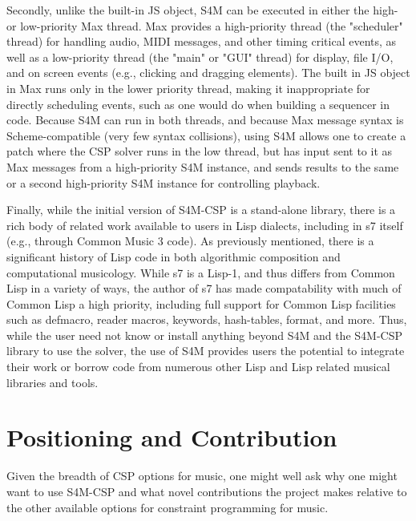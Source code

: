 \documentclass[pmlr]{jmlr}%
\begin{document}
Secondly, unlike the built-in JS object, S4M can be executed in either the high- or low-priority Max thread.
Max provides a high-priority thread (the "scheduler" thread) for handling audio, MIDI messages, and other
timing critical events, as well as a low-priority thread (the "main" or "GUI" thread) for display, file I/O,
and on screen events (e.g., clicking and dragging elements). The built in JS object in Max runs only in the
lower priority thread, making it inappropriate for directly scheduling events, such as one would do 
when building a sequencer in code. Because S4M can run in both threads, and because Max message syntax
is Scheme-compatible (very few syntax collisions), using S4M allows one to create a patch where the
CSP solver runs in the low thread, but has input sent to it as Max messages from a high-priority S4M instance, and sends
results to the same or a second high-priority S4M instance for controlling playback. 

Finally, while the initial version of S4M-CSP is a stand-alone library, there is a rich body of related
work available to users in Lisp dialects, including in s7 itself (e.g., through Common Music 3 code).
As previously mentioned, there is a significant history of Lisp code in both algorithmic composition
and computational musicology. While s7 is a Lisp-1, and thus differs from Common Lisp in a variety of ways,
the author of s7 has made compatability with much of Common Lisp a high priority, including full support
for Common Lisp facilities such as defmacro, reader macros, keywords, hash-tables, format, and more.
Thus, while the user need not know or install anything beyond S4M and the S4M-CSP library to use the
solver, the use of S4M provides users the potential to integrate their work or borrow code from 
numerous other Lisp and Lisp related musical libraries and tools.


\section{Positioning and Contribution}
Given the breadth of CSP options for music, one might well ask why one might want to use S4M-CSP
and what novel contributions the project makes relative to the other available options
for constraint programming for music.
\end{document}
